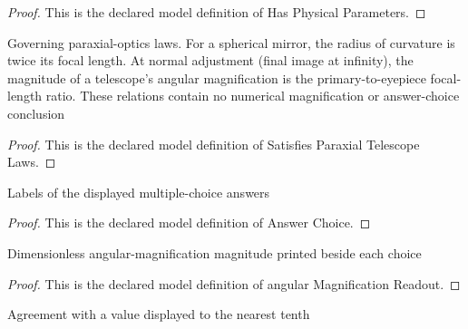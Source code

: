 \begin{proof}
  This is the declared model definition of Has Physical Parameters.
\end{proof}
\begin{definition}
  \label{def:physics:phyx-mini-0108:phyxminiproblems-problemphyxmini0108-satisfiesparaxialtelescopelaws}
  Governing paraxial-optics laws. For a spherical mirror, the radius of curvature is twice its focal length. At normal adjustment (final image at infinity), the magnitude of a telescope's angular magnification is the primary-to-eyepiece focal-length ratio. These relations contain no numerical magnification or answer-choice conclusion
\end{definition}
\begin{proof}
  This is the declared model definition of Satisfies Paraxial Telescope Laws.
\end{proof}
\begin{definition}
  \label{def:physics:phyx-mini-0108:phyxminiproblems-problemphyxmini0108-answerchoice}
  Labels of the displayed multiple-choice answers
\end{definition}
\begin{proof}
  This is the declared model definition of Answer Choice.
\end{proof}
\begin{definition}
  \label{def:physics:phyx-mini-0108:phyxminiproblems-problemphyxmini0108-answerchoice-angularmagnificationreadout}
  Dimensionless angular-magnification magnitude printed beside each choice
\end{definition}
\begin{proof}
  This is the declared model definition of angular Magnification Readout.
\end{proof}
\begin{definition}
  \label{def:physics:phyx-mini-0108:phyxminiproblems-problemphyxmini0108-roundstonearesttenth}
  Agreement with a value displayed to the nearest tenth
\end{definition}
